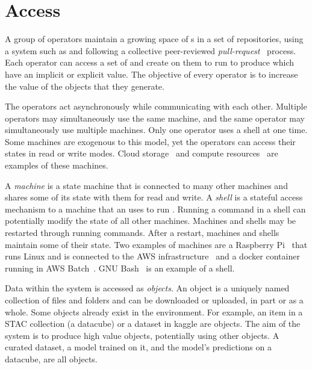 \section{Access}

A group of operators maintain a growing space of s in a set of repositories, using a system such as  and following a collective peer-reviewed \emph{pull-request}~\cite{pull_request} process. Each operator can access a set of  and create  on them to run  to produce  which have an implicit or explicit value. The objective of every operator is to increase the value of the objects that they generate.

The operators act asynchronously while communicating with each other. Multiple operators may simultaneously use the same machine, and the same operator may simultaneously use multiple machines. Only one operator uses a shell at one time. Some machines are exogenous to this model, yet the operators can access their states in read or write modes. Cloud storage~\cite{aws_s3} and compute resources~\cite{aws_batch} are examples of these machines.

A \emph{machine} is a state machine that is connected to many other machines and shares some of its state with them for read and write. A \emph{shell} is a stateful access mechanism to a machine that an  uses to run . Running a command in a shell can potentially modify the state of all other machines. Machines and shells may be restarted through running commands. After a restart, machines and shells maintain some of their state. Two examples of machines are a Raspberry Pi~\cite{rpi} that runs Linux and is connected to the AWS infrastructure~\cite{aws} and a docker container~\cite{docker} running in AWS Batch~\cite{aws_batch}. GNU Bash~\cite{gnu_bash} is an example of a shell.

Data within the system is accessed as \emph{objects}. An object is a uniquely named collection of files and folders and can be downloaded or uploaded, in part or as a whole. Some objects already exist in the environment. For example, an item in a STAC collection (a datacube) or a dataset in kaggle are objects. The aim of the system is to produce high value objects, potentially using other objects. A curated dataset, a model trained on it, and the model's predictions on a datacube, are all objects.

